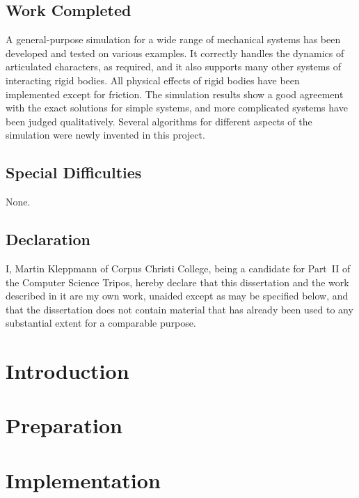\documentclass[11pt,a4paper,twoside,notitlepage]{report}
\begin{document}
\section*{Work Completed}
A general-purpose simulation for a wide range of mechanical systems has been developed and tested
on various examples. It correctly handles the dynamics of articulated characters, as required,
and it also supports many other systems of interacting rigid bodies. All physical effects
of rigid bodies have been implemented except for friction. The simulation results show a good
agreement with the exact solutions for simple systems, and more complicated systems have been
judged qualitatively. Several algorithms for different aspects of the simulation were newly
invented in this project.

\section*{Special Difficulties}
None.

\newpage
\vspace*{60mm}
\section*{Declaration}

I, Martin Kleppmann of Corpus Christi College, being a candidate for Part~II of the Computer
Science Tripos, hereby declare that this dissertation and the work described in it are my own
work, unaided except as may be specified below, and that the dissertation does not contain
material that has already been used to any substantial extent for a comparable purpose.

\vspace{20mm}
\vspace{12mm}
\cleardoublepage

\tableofcontents
\chapter{Introduction}

\chapter{Preparation}





\chapter{Implementation}


\end{document}
